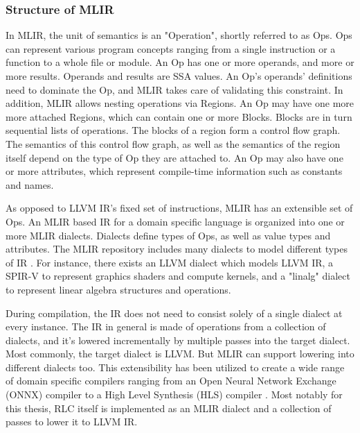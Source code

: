 \subsubsection{Structure of MLIR}
In MLIR, the unit of semantics is an "Operation", shortly referred to as Ops. Ops can represent various program concepts ranging from a single instruction or a function to a whole file or module.
An Op has one or more operands, and more or more results. Operands and results are SSA values.
An Op's operands' definitions need to dominate the Op, and MLIR takes care of validating this constraint.
In addition, MLIR allows nesting operations via Regions. An Op may have one more more attached Regions, which can contain one or more Blocks.
Blocks are in turn sequential lists of operations.
The blocks of a region form a control flow graph.
The semantics of this control flow graph, as well as the semantics of the region itself depend on the type of Op they are attached to.
An Op may also have one or more attributes, which represent compile-time information such as constants and names.

As opposed to LLVM IR's fixed set of instructions, MLIR has an extensible set of Ops.
An MLIR based IR for a domain specific language is organized into one or more MLIR dialects.
Dialects define types of Ops, as well as value types and attributes.
The MLIR repository includes many dialects to model different types of IR \cite{MLIRDialects}.
For instance, there exists an LLVM dialect which models LLVM IR, a SPIR-V to represent graphics shaders and compute kernels, and a "linalg" dialect to represent linear algebra structures and operations.

During compilation, the IR does not need to consist solely of a single dialect at every instance.
The IR in general is made of operations from a collection of dialects, and it's lowered incrementally by multiple passes into the target dialect.
Most commonly, the target dialect is LLVM. But MLIR can support lowering into different dialects too.
This extensibility has been utilized to create a wide range of domain specific compilers ranging from an Open Neural Network Exchange (ONNX) compiler \cite{onnx-mlir} to a High Level Synthesis (HLS) compiler \cite{ScaleHLS}.
Most notably for this thesis, RLC itself is implemented as an MLIR dialect and a collection of passes to lower it to LLVM IR.

